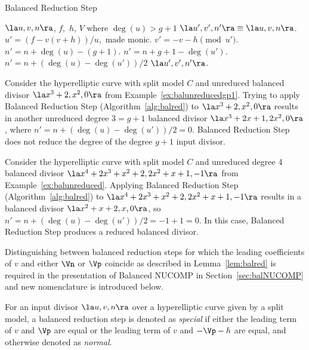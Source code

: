 \begin{algorithm}[ht]
  \caption{Balanced Reduction Step}
  \label{alg:balred}
  {\fontsize{12}{18}\selectfont
  \begin{algorithmic}[1]
  \Require $\la u,v,n \ra$, $f,$ $h$, $V$ where $\deg(u) > g+1$
  \Ensure $\la u',v',n' \ra \equiv \la u,v,n \ra$.
  \vspace{5pt}
  \State $u' = (f-v(v + h))/u,$ made monic. 
  \State $v' = -v-h \pmod{u'}$.
    \State $n' = n + \deg(u) - (g+1)$.
    \State $n' = n + g + 1 - \deg(u')$.
  \Else
    \State $n' = n + (\deg(u) - \deg(u'))/2$
  \EndIf
  \State \Return $\la u',v',n' \ra$.
  \end{algorithmic}
  }
\end{algorithm}

\be\label{ex:balnored}
Consider the hyperelliptic curve with split model $C$ and unreduced balanced divisor $\la
x^3 + 2, x^2, 0 \ra$ from Example~\ref{ex:balunreducedgp1}. Trying to apply
Balanced Reduction Step (Algorithm~\ref{alg:balred}) to $\la x^3 + 2, x^2, 0 \ra$
results in another unreduced degree $3 = g+1$ balanced divisor $\la x^3 + 2x +
1, 2x^2, 0 \ra$, where $n' = n + (\deg(u) - \deg(u'))/2 = 0.$ Balanced
Reduction Step does not reduce the degree of the degree $g+1$ input divisor.
\ee

\be\label{ex:balred}
Consider the hyperelliptic curve with split model $C$ and unreduced degree 4 balanced
divisor $\la x^4 + 2x^3 + x^2 + 2, 2x^2 + x + 1, -1 \ra$ from
Example~\ref{ex:balunreduced}. Applying Balanced Reduction Step
(Algorithm~\ref{alg:balred}) to $\la x^4 + 2x^3 + x^2 + 2, 2x^2 + x + 1, -1 \ra$
results in a balanced divisor $\la x^2 + x + 2, x, 0 \ra$, so $n' = n +
(\deg(u) - \deg(u'))/2 = -1 + 1 = 0.$ In this case, Balanced Reduction Step produces
a reduced balanced divisor.
\ee

Distinguishing between balanced reduction steps for which the leading
coefficients of $v$ and either $\Vn$ or $\Vp$ coincide as described in
Lemma~\ref{lem:balred} is required in the presentation of Balanced NUCOMP in
Section~\ref{sec:balNUCOMP} and new nomenclature is introduced below.


\bd\label{def:specialred} For an input divisor $\la u,v,n \ra$ over a
hyperelliptic curve given by a split model, a balanced reduction step is denoted
as \emph{special} if either the leading term of $v$ and $\Vp$ are equal or the
leading term of $v$ and $-\Vp - h$ are equal, and otherwise denoted as
\emph{normal}.
\ed




